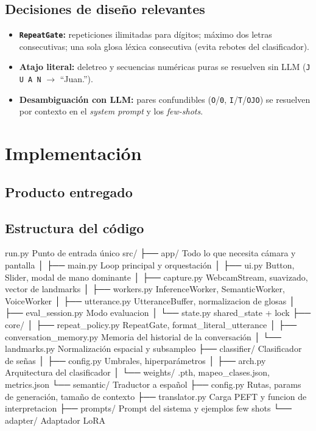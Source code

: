 \documentclass[12pt,a4paper]{report}
\begin{document}
\section{Decisiones de diseño relevantes}
\begin{itemize}
    \item \textbf{\texttt{RepeatGate}:} repeticiones ilimitadas para dígitos; máximo dos letras consecutivas; una sola glosa léxica consecutiva (evita rebotes del clasificador).
    \item \textbf{Atajo literal:} deletreo y secuencias numéricas puras se resuelven sin LLM (\texttt{J U A N} $\rightarrow$ ``Juan.'').
    \item \textbf{Desambiguación con LLM:} pares confundibles (\texttt{O}/\texttt{0}, \texttt{I}/\texttt{T}/\texttt{OJO}) se resuelven por contexto en el \textit{system prompt} y los \textit{few-shots}.
\end{itemize}

\chapter{Implementación}
\section{Producto entregado}


\section{Estructura del código}
run.py                         Punto de entrada único
src/
├── app/                       Todo lo que necesita cámara y pantalla
│   ├── main.py                Loop principal y orquestación
│   ├── ui.py                  Button, Slider, modal de mano dominante
│   ├── capture.py             WebcamStream, suavizado, vector de landmarks
│   ├── workers.py             InferenceWorker, SemanticWorker, VoiceWorker
│   ├── utterance.py           UtteranceBuffer, normalizacion de glosas
│   ├── eval_session.py        Modo evaluacion
│   └── state.py               shared_state + lock
├── core/
│   ├── repeat_policy.py       RepeatGate, format_literal_utterance
│   ├── conversation_memory.py Memoria del historial de la conversación
│   └── landmarks.py           Normalización espacial y subsampleo
├── classifier/                Clasificador de señas
│   ├── config.py              Umbrales, hiperparámetros
│   ├── arch.py                Arquitectura del clasificador
│   └── weights/               .pth, mapeo_clases.json, metrics.json
└── semantic/                  Traductor a español
    ├── config.py              Rutas, params de generación, tamaño de contexto
    ├── translator.py          Carga PEFT y funcion de interpretacion
    ├── prompts/               Prompt del sistema y ejemplos few shots
    └── adapter/               Adaptador LoRA
\end{document}
